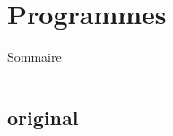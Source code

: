 \documentclass[9pt]{beamer}
\begin{document}
\section{Programmes}

\begin{frame}{Sommaire}
	\begin{columns}[onlytextwidth,T]
        \begin{column}{.45\textwidth}
            \tableofcontents[currentsection, sections=1-2]
        \end{column}
        \begin{column}{.45\textwidth}
            \tableofcontents[currentsection, sections=3-5]
        \end{column}
    \end{columns}
\end{frame}



\subsection{original}
\end{document}
